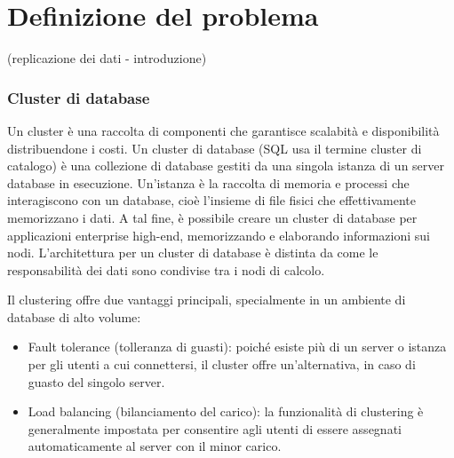 %
\chapter{Definizione del problema}
\setcounter{section}{1}
(replicazione dei dati - introduzione)
\subsection{Cluster di database}
Un cluster \`{e} una raccolta di componenti che garantisce scalabit\`{a} e disponibilit\`{a} distribuendone i costi. Un cluster di database (SQL usa il termine cluster di catalogo) \`{e} una collezione di database gestiti da una singola istanza di un server database in esecuzione. Un'istanza \`{e} la raccolta di memoria e processi che interagiscono con un database, cioè l'insieme di file fisici che effettivamente memorizzano i dati. A tal fine, \`{e} possibile creare un cluster di database per applicazioni enterprise high-end, memorizzando e elaborando informazioni sui nodi. L'architettura per un cluster di database \`{e} distinta da come le responsabilit\`{a} dei dati sono condivise tra i nodi di calcolo.

Il clustering offre due vantaggi principali, specialmente in un ambiente di database di alto volume:
\begin{itemize}
\item 
Fault tolerance (tolleranza di guasti): poich\'{e} esiste pi\`{u} di un server o istanza per gli utenti a cui connettersi, il cluster offre un'alternativa, in caso di guasto del singolo server.
\item
Load balancing (bilanciamento del carico): la funzionalit\`{a} di clustering \`{e} generalmente impostata per consentire agli utenti di essere assegnati automaticamente al server con il minor carico.
\end{itemize}

